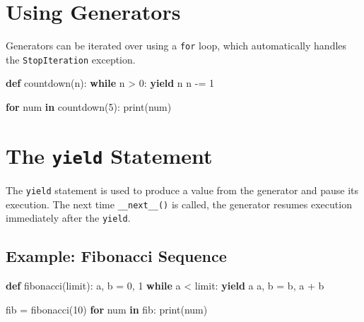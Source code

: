 \documentclass[
  letterpaper,
  DIV=11,
  numbers=noendperiod]{scrreprt}
\newenvironment{Shaded}{\begin{snugshade}}{\end{snugshade}}
\newcommand{\BuiltInTok}[1]{\textcolor[rgb]{0.00,0.23,0.31}{#1}}
\newcommand{\ControlFlowTok}[1]{\textcolor[rgb]{0.00,0.23,0.31}{\textbf{#1}}}
\newcommand{\DecValTok}[1]{\textcolor[rgb]{0.68,0.00,0.00}{#1}}
\newcommand{\KeywordTok}[1]{\textcolor[rgb]{0.00,0.23,0.31}{\textbf{#1}}}
\newcommand{\NormalTok}[1]{\textcolor[rgb]{0.00,0.23,0.31}{#1}}
\newcommand{\OperatorTok}[1]{\textcolor[rgb]{0.37,0.37,0.37}{#1}}
\begin{document}
\section{Using Generators}\label{using-generators}

Generators can be iterated over using a \texttt{for} loop, which
automatically handles the \texttt{StopIteration} exception.

\begin{Shaded}
\begin{Highlighting}[]
\KeywordTok{def}\NormalTok{ countdown(n):}
    \ControlFlowTok{while}\NormalTok{ n }\OperatorTok{\textgreater{}} \DecValTok{0}\NormalTok{:}
        \ControlFlowTok{yield}\NormalTok{ n}
\NormalTok{        n }\OperatorTok{{-}=} \DecValTok{1}

\ControlFlowTok{for}\NormalTok{ num }\KeywordTok{in}\NormalTok{ countdown(}\DecValTok{5}\NormalTok{):}
    \BuiltInTok{print}\NormalTok{(num)}
\end{Highlighting}
\end{Shaded}

\section{\texorpdfstring{The \texttt{yield}
Statement}{The yield Statement}}\label{the-yield-statement}

The \texttt{yield} statement is used to produce a value from the
generator and pause its execution. The next time \texttt{\_\_next\_\_()}
is called, the generator resumes execution immediately after the
\texttt{yield}.

\subsection{Example: Fibonacci
Sequence}\label{example-fibonacci-sequence}

\begin{Shaded}
\begin{Highlighting}[]
\KeywordTok{def}\NormalTok{ fibonacci(limit):}
\NormalTok{    a, b }\OperatorTok{=} \DecValTok{0}\NormalTok{, }\DecValTok{1}
    \ControlFlowTok{while}\NormalTok{ a }\OperatorTok{\textless{}}\NormalTok{ limit:}
        \ControlFlowTok{yield}\NormalTok{ a}
\NormalTok{        a, b }\OperatorTok{=}\NormalTok{ b, a }\OperatorTok{+}\NormalTok{ b}

\NormalTok{fib }\OperatorTok{=}\NormalTok{ fibonacci(}\DecValTok{10}\NormalTok{)}
\ControlFlowTok{for}\NormalTok{ num }\KeywordTok{in}\NormalTok{ fib:}
    \BuiltInTok{print}\NormalTok{(num)}
\end{Highlighting}
\end{Shaded}
\end{document}

